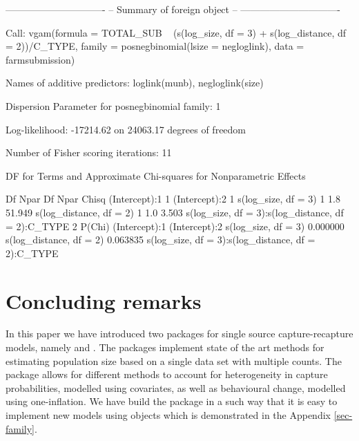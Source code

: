 \documentclass[
]{jss}
\newcommand{\1}{\mathcal{I}} \newcommand{\bZero}{\boldsymbol{0}}
\begin{document}
\begin{CodeChunk}
\begin{CodeOutput}
-------------------------------
-- Summary of foreign object --
-------------------------------

Call:
vgam(formula = TOTAL_SUB ~ (s(log_size, df = 3) + s(log_distance, 
    df = 2))/C_TYPE, family = posnegbinomial(lsize = negloglink), 
    data = farmsubmission)

Names of additive predictors: loglink(munb), negloglink(size)

Dispersion Parameter for posnegbinomial family:   1

Log-likelihood: -17214.62 on 24063.17 degrees of freedom

Number of Fisher scoring iterations:  11 

DF for Terms and Approximate Chi-squares for Nonparametric Effects

                                                   Df Npar Df Npar Chisq
(Intercept):1                                       1                   
(Intercept):2                                       1                   
s(log_size, df = 3)                                 1     1.8     51.949
s(log_distance, df = 2)                             1     1.0      3.503
s(log_size, df = 3):s(log_distance, df = 2):C_TYPE  2                   
                                                     P(Chi)
(Intercept):1                                              
(Intercept):2                                              
s(log_size, df = 3)                                0.000000
s(log_distance, df = 2)                            0.063835
s(log_size, df = 3):s(log_distance, df = 2):C_TYPE         
\end{CodeOutput}
\end{CodeChunk}

\normalsize

\section{Concluding remarks}\label{concluding-remarks}

In this paper we have introduced two packages for single source
capture-recapture models, namely  and
. The packages implement state of the art
methods for estimating population size based on a single data set with
multiple counts. The package allows for different methods to account for
heterogeneity in capture probabilities, modelled using covariates, as
well as behavioural change, modelled using one-inflation. We have build
the package in a such way that it is easy to implement new models using
 objects which is demonstrated in the Appendix
\ref{sec-family}.
\end{document}
